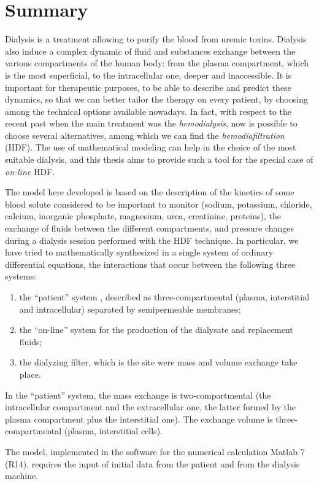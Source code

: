 \chapter*{Summary}
Dialysis is a treatment allowing to purify the blood from uremic toxins. Dialysis also induce a complex dynamic of fluid and substances exchange between the various compartments of the human body: from the plasma compartment, which is the most superficial, to the intracellular one, deeper and inaccessible. It is important for therapeutic purposes, to be able to describe and predict these dynamics, so that we can better tailor the therapy on every patient, by choosing among the technical options available nowadays. In fact, with respect to the recent past when the main treatment was the \textit{hemodialysis}, now is possible to choose several alternatives, among which we can find the \textit{hemodiafiltration} (HDF).
The use of mathematical modeling can help in the choice of the most suitable dialysis, and this thesis aims to provide such a tool for the special case of \textit{on-line} HDF.

The model here developed is based on the description of the kinetics of some blood solute considered to be important to monitor (sodium, potassium, chloride, calcium, inorganic phosphate, magnesium, urea, creatinine, proteins), the exchange of fluids between the different compartments, and pressure changes during a dialysis session performed with the HDF technique. In particular, we have tried to mathematically synthesized in a single system of ordinary differential equations, the interactions that occur between the following three systems:
\begin{enumerate}
	\item the ``patient'' system , described as three-compartmental (plasma, interstitial and intracellular) separated by semipermeable membranes;
	\item the ``on-line'' system for the production of the dialysate and replacement fluids;
	\item the  dialyzing filter, which is the site were mass and volume exchange take place.
\end{enumerate}
In the ``patient'' system, the mass exchange is two-compartmental (the intracellular compartment and the extracellular one, the latter formed by the plasma compartment plus the interstitial one). The exchange volume is three-compartmental (plasma, interstitial cells).

The model, implemented in the software for the numerical calculation Matlab\textsuperscript\textregistered{} 7 (R14), requires the input of initial data from the patient and from the dialysis machine.

